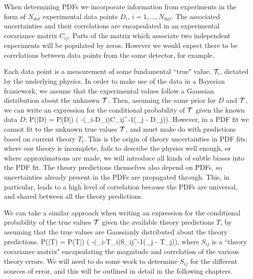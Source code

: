 When determining PDFs we incorporate information from experiments in the form of $N_{dat}$ experimental data points $D_i$, $i=1,...,N_{dat}$. The associated uncertainties and their correlations are encapsulated in an experimental covariance matrix $C_{ij}$. Parts of the matrix which associate two independent experiments will be populated by zeros. However we would expect there to be correlations between data points from the same detector, for example.

Each data point is a measurement of some fundamental ``true" value, $\mathcal{T}_i$, dictated by the underlying physics. In order to make use of the data in a Bayesian framework, we assume that the experimental values follow a Gaussian distribution about the unknown $\mathcal{T}$. Then, assuming the same prior for $D$ and $\mathcal{T}$, we can write an expression for the conditional probability of $\mathcal{T}$ given the known data $D$:
\beq
\label{eqn:gaussexp}
P(\truev|D) = P(D|\truev) \propto \exp\bigg( -(\truev_i-D_i)C_{ij}^{-1}(\truev_j - D_j)\bigg).
\eeq
However, in a PDF fit we cannot fit to the unknown true values $\mathcal{T}$, and must make do with predictions based on current theory $T_i$. This is the origin of theory uncertainties in PDF fits; where our theory is incomplete, fails to describe the physics well enough, or where approximations are made, we will introduce all kinds of subtle biases into the PDF fit. The theory predictions themselves also depend on PDFs, so uncertainties already present in the PDFs are propagated through. This, in particular, leads to a high level of correlation because the PDFs are universal, and shared between all the theory predictions. 

We can take a similar approach when writing an expression for the conditional probability of the true values $\mathcal{T}$ given the available theory predictions $T$, by assuming that the true values are Gaussianly distributed about the theory predictions.
\beq
\label{eqn:gausstheory}
P(\truev|T) = P(T|\truev) \propto \exp\bigg( -(\truev_i-T_i)S_{ij}^{-1}(\truev_j - T_j)\bigg),
\eeq
where $S_{ij}$ is a ``theory covariance matrix" encapsulating the magnitude and correlation of the various theory errors. We will need to do some work to determine $S_{ij}$ for the different sources of error, and this will be outlined in detail in the following chapters. 

